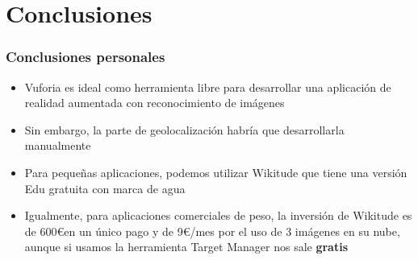 \section{Conclusiones}
\frame
{
\frametitle{Conclusiones personales}
\begin{itemize}
 \item Vuforia es ideal como herramienta libre para desarrollar una aplicación de realidad aumentada con reconocimiento de imágenes
 \item Sin embargo, la parte de geolocalización habría que desarrollarla manualmente
 \item Para pequeñas aplicaciones, podemos utilizar Wikitude que tiene una versión Edu gratuita con marca de agua
 \item Igualmente, para aplicaciones comerciales de peso, la inversión de Wikitude es de 600\euro \hspace{0.15cm}en un único pago y de 9\euro/mes por el uso de 3 imágenes en su nube, aunque si usamos la herramienta Target Manager nos sale \textbf{gratis}
\end{itemize}
}
